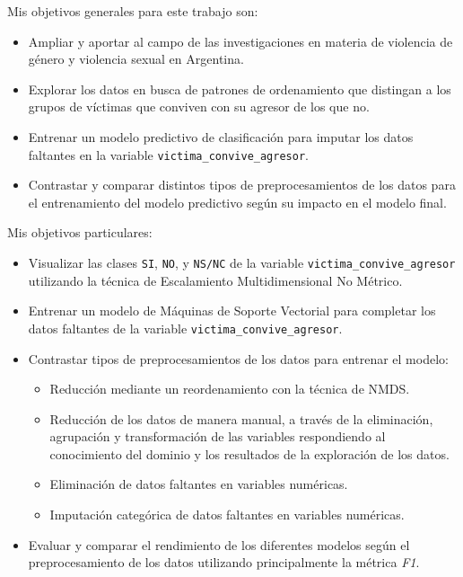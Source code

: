 \documentclass[10 pt]{article}
\begin{document}
Mis objetivos generales para este trabajo son:

\begin{itemize}
    \item Ampliar y aportar al campo de las investigaciones en materia de violencia de género y violencia sexual en Argentina.
    \item Explorar los datos en busca de patrones de ordenamiento que distingan a los grupos de víctimas que conviven con su agresor de los que no.
    \item Entrenar un modelo predictivo de clasificación para imputar los datos faltantes en la variable \texttt{victima\_convive\_agresor}. 
    \item Contrastar y comparar distintos tipos de preprocesamientos de los datos para el entrenamiento del modelo predictivo según su impacto en el modelo final. 

\end{itemize}

Mis objetivos particulares:

\begin{itemize}
\item Visualizar las clases \texttt{SI}, \texttt{NO}, y \texttt{NS/NC} de la variable \texttt{victima\_convive\_agresor} utilizando la técnica de Escalamiento Multidimensional No Métrico.
\item Entrenar un modelo de Máquinas de Soporte Vectorial para completar los datos faltantes de la variable \texttt{victima\_convive\_agresor}.
\item Contrastar tipos de preprocesamientos de los datos para entrenar el modelo: 
\begin{itemize}
    \item Reducción mediante un reordenamiento con la técnica de NMDS.
    \item Reducción de los datos de manera manual, a través de la eliminación, agrupación y transformación de las variables respondiendo al conocimiento del dominio y los resultados de la exploración de los datos. 
    \item Eliminación de datos faltantes en variables numéricas.
    \item Imputación categórica de datos faltantes en variables numéricas. 
\end{itemize}
\item Evaluar y comparar el rendimiento de los diferentes modelos según el preprocesamiento de los datos utilizando principalmente la métrica \textit{F1}.
    
\end{itemize}
\end{document}
